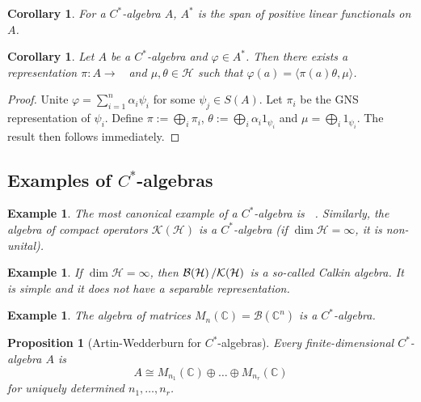 \documentclass[10pt, a4paper]{article}
\newtheorem{corollary}[thm]{Corollary}
\newtheorem{proposition}[thm]{Proposition}
\newtheorem{example}[thm]{Example}
\newenvironment{noticeC}{%
  \tcolorbox[%
  notitle,
  empty,
  enhanced,  %
  breakable,
  coltext=black, 
  fontupper=\rmfamily,
  noparskip,
  sharp corners,
  boxrule=-1pt,  %
  frame hidden,
  left=7pt,  %
  right=7pt,
  top=5pt,
  bottom=5pt,
  before skip=2.5ex plus 2pt,
  after skip=2.5ex plus 2pt,
  overlay unbroken and last={%
  },
  ]}
{\endtcolorbox}
\newenvironment{myproof}%
  {\begin{noticeC}\begin{proof}}%
  {\end{proof}\end{noticeC}}
\newcommand{\C}{\mathbb {C}}
\newcommand{\quot}[2]{{\raisebox{0em}{$#1$}\left/\raisebox{0em}{$#2$}\right.}}
\DeclareMathOperator{\bh}{\mathcal{B} (\mathcal{H})}
\begin{document}
\begin{corollary}
  For a $C^*$-algebra $A$, $A^*$ is the span of positive linear functionals on $A$.
\end{corollary}

\begin{corollary}
  Let $A$ be a $C^*$-algebra and $\varphi \in A^*$. Then there exists a representation $\pi: A \to \bh$
  and $\mu, \theta \in \mathcal{H}$ such that $\varphi(a) = \langle \pi(a) \theta, \mu \rangle$.
\end{corollary}

\begin{myproof}
  Unite $\varphi = \sum_{i = 1} ^n \alpha_i \psi_i$ for some $\psi_j \in S(A)$.
  Let $\pi_i$ be the GNS representation of $\psi_i$. Define $\pi := \bigoplus_i \pi_i$,
  $\theta := \bigoplus_i \alpha_i 1_{\psi_i}$ and $\mu = \bigoplus_i 1_{\psi_i}$.
  The result then follows immediately.
\end{myproof}

\subsection{Examples of $C^*$-algebras}

\begin{example}
  The most canonical example of a $C^*$-algebra is $\bh$.
  Similarly, the algebra of compact operators $\mathcal{K}(\mathcal{H})$ is a $C^*$-algebra 
  (if $\dim \mathcal{H} = \infty$, it is non-unital).
\end{example}

\begin{example}
  If $\dim \mathcal{H} = \infty$, then $\quot{\bh}{\mathcal{K}(\mathcal{H})}$ is a so-called Calkin algebra.
  It is simple and it does not have a separable representation.
\end{example}

\begin{example}
  The algebra of matrices $M_n (\C) = \mathcal{B}(\C^n)$ is a $C^*$-algebra.
\end{example}

\begin{proposition}[Artin-Wedderburn for $C^*$-algebras]
  Every finite-dimensional $C^*$-algebra $A$ is 
  $$ A \cong M_{n_1} (\C) \oplus \dots \oplus M_{n_r} (\C)$$
  for uniquely determined $n_1, \dots, n_r$.
\end{proposition}
\end{document}
